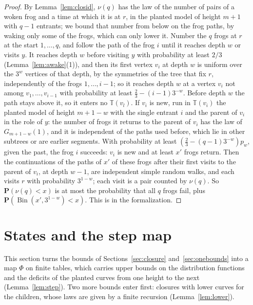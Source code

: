 \documentclass[11pt]{amsart}
\theoremstyle{definition}
\numberwithin{equation}{section}
\newcommand{\T}{\mathbb{T}}
\renewcommand{\P}{\mathbf{P}}
\newcommand{\Bin}{\operatorname{Bin}}
\begin{document}
\begin{proof}
By Lemma~\ref{lem:closid}, $\nu(q)$ has the law of the number of pairs of a woken frog and a time at which it is at $r$, in the planted model of height $m+1$ with $q-1$ entrants; we bound that number from below on the frog paths, by waking only some of the frogs, which can only lower it. Number the $q$ frogs at $r$ at the start $1,\dots,q$, and follow the path of the frog $i$ until it reaches depth $w$ or visits $y$. It reaches depth $w$ before visiting $y$ with probability at least $2/3$ (Lemma~\ref{lem:awake}(1)), and then its first vertex $v_i$ at depth $w$ is uniform over the $3^w$ vertices of that depth, by the symmetries of the tree that fix $r$, independently of the frogs $1,\dots,i-1$; so it reaches depth $w$ at a vertex $v_i$ not among $v_1,\dots,v_{i-1}$ with probability at least $\frac23-(i-1)3^{-w}$. Before depth $w$ the path stays above it, so it enters no $\T(v_l)$. If $v_i$ is new, run in $\T(v_i)$ the planted model of height $m+1-w$ with the single entrant $i$ and the parent of $v_i$ in the role of $y$: the number of frogs it returns to the parent of $v_i$ has the law of $G_{m+1-w}(1)$, and it is independent of the paths used before, which lie in other subtrees or are earlier segments. With probability at least $(\frac23-(q-1)3^{-w})p_w$, given the past, the frog $i$ succeeds: $v_i$ is new and at least $x'$ frogs return. Then the continuations of the paths of $x'$ of these frogs after their first visits to the parent of $v_i$, at depth $w-1$, are independent simple random walks, and each visits $r$ with probability $3^{1-w}$; each visit is a pair counted by $\nu(q)$. So $\P(\nu(q)<x)$ is at most the probability that all $q$ frogs fail, plus $\P(\Bin(x',3^{1-w})<x)$. This is  in the formalization.
\end{proof}

\section{States and the step map}\label{sec:states}

This section turns the bounds of Sections~\ref{sec:closure} and~\ref{sec:onebounds} into a map $\Phi$ on finite tables, which carries upper bounds on the distribution functions and the deficits of the planted curves from one height to the next (Lemma~\ref{lem:step}). Two more bounds enter first: closures with lower curves for the children, whose laws are given by a finite recursion (Lemma~\ref{lem:lower}).
\end{document}
